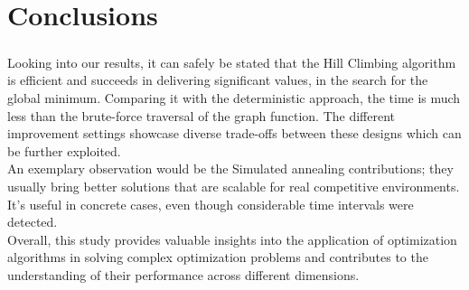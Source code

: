 \documentclass{article}
\begin{document}
\section{Conclusions}

\subparagraph{}
Looking into our results, it can safely be stated that the Hill Climbing algorithm is efficient and succeeds in delivering significant values, in the search for the global minimum. Comparing it with the deterministic approach, the time is much less than the brute-force traversal of the graph function. The different improvement settings showcase diverse trade-offs between these designs which can be further exploited. \\

An exemplary observation would be the Simulated annealing contributions; they usually bring better solutions that are scalable for real competitive environments. It's useful in concrete cases, even though considerable time intervals were detected. \\

Overall, this study provides valuable insights into the application of optimization algorithms in solving complex optimization problems and contributes to the understanding of their performance across different dimensions. 

\end{document}
